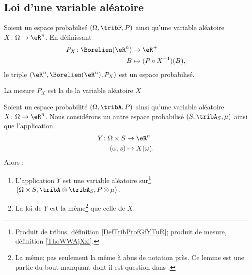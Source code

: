 \subsection{Loi d'une variable aléatoire}

\begin{propositionDef}        \label{DEFooBKJVooRJdMeA}
    Soient un espace probabilisé \( (\Omega,\tribF,P)\) ainsi qu'une variable aléatoire \( X\colon \Omega\to \eR^n\). En définissant
    \begin{equation}
        \begin{aligned}
            P_X\colon \Borelien(\eR^n)&\to \eR^+ \\
            B&\mapsto (P\circ X^{-1})(B), 
        \end{aligned}
    \end{equation}
    le triple \( (\eR^n,\Borelien(\eR^n),P_X)\) est un espace probabilisé.

    La mesure \( P_X\) est la  de la variable aléatoire \( X\)
\end{propositionDef}

\begin{lemma}       \label{LEMooHVFJooBDZYnT}
    Soient un espace probabilité \( (\Omega,\tribA,P)\) ainsi qu'une variable aléatoire \( X\colon \Omega\to \eR^n\). Nous considérons un autre espace probabilisé \( (S,\tribA_S,\mu)\) ainsi que l'application
    \begin{equation}
        \begin{aligned}
            Y\colon \Omega\times S&\to \eR^n \\
            (\omega,s)&\mapsto X(\omega). 
        \end{aligned}
    \end{equation}
    Alors :
    \begin{enumerate}
        \item   \label{ITEMooDSIKooSqdyJb}
                L'application \( Y\) est une variable aléatoire sur\footnote{Produit de tribus, définition \ref{DefTribProfGfYTuR}; produit de mesure, définition \ref{ThoWWAjXzi}.} \( \big( \Omega\times S,\tribA\otimes\tribA_S,P\otimes\mu \big)\).
            \item   \label{ITEMooQMMHooPcGKoD}
                La loi de \( Y\) est la même\footnote{La même; pas seulement la même à abus de notation près. Ce lemme est une partie du bout manquant dont il est question dans \cite{BIBooWPRAooVIOYhF}.} que celle de \( X\).     
        \end{enumerate}
\end{lemma}


